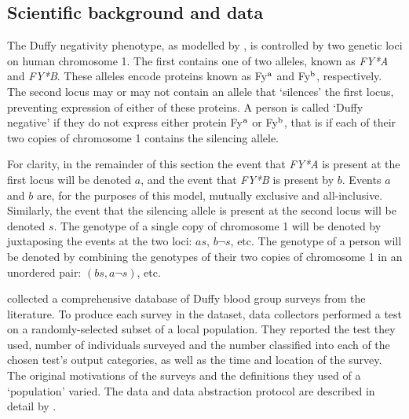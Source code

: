 \documentclass[article]{jss}
\begin{document}
\subsection{Scientific background and data}
\label{subsec:duffy-data} 
The Duffy negativity phenotype, as modelled by \cite{Howes}, is controlled by two genetic loci on human chromosome 1. The first contains one of two alleles, known as \emph{FY*A} and \emph{FY*B}. These alleles encode proteins known as Fy$^\textup{a}$ and Fy$^\textup{b}$, respectively. The second locus may or may not contain an allele that `silences' the first locus, preventing expression of either of these proteins. A person is called `Duffy negative' if they do not express either protein Fy$^\textup{a}$ or Fy$^\textup{b}$, that is if each of their two copies of chromosome 1 contains the silencing allele. 

For clarity, in the remainder of this section the event that \emph{FY*A} is present at the first locus will be denoted $a$, and the event that \emph{FY*B} is present by $b$. Events $a$ and $b$ are, for the purposes of this model, mutually exclusive and all-inclusive. Similarly, the event that the silencing allele is present at the second locus will be denoted $s$. The genotype of a single copy of chromosome 1 will be denoted by juxtaposing the events at the two loci: $as$, $b\neg s$, etc. The genotype of a person will be denoted by combining the genotypes of their two copies of chromosome 1 in an unordered pair: $(bs,a \neg s)$, etc.

\cite{Howes} collected a comprehensive database of Duffy blood group surveys from the literature. To produce each survey in the dataset, data collectors performed a test on a randomly-selected subset of a local population. They reported the test they used, number of individuals surveyed and the number classified into each of the chosen test's output categories, as well as the time and location of the survey. The original motivations of the surveys and the definitions they used of a `population' varied. The data and data abstraction protocol are described in detail by \cite{Howes}. 
\end{document}
